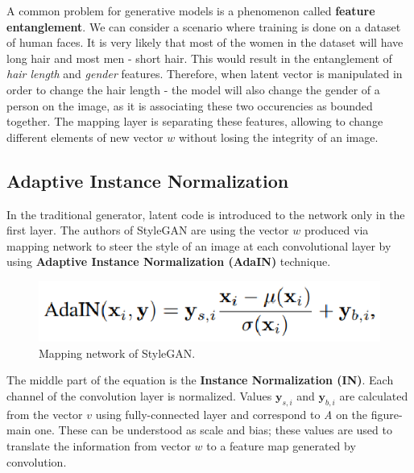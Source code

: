 \documentclass[12pt,a4paper,openany]{book}
\begin{document}
A common problem for generative models is a phenomenon called \textbf{feature entanglement}. We can consider a scenario where training is done on a dataset of human faces. It is very likely that most of the women in the dataset will have long hair and most men - short hair. This would result in the entanglement of \textit{hair length} and \textit{gender} features. Therefore, when latent vector is manipulated in order to change the hair length - the model will also change the gender of a person on the image, as it is associating these two occurencies as bounded together. The mapping layer is separating these features, allowing to change different elements of new vector $w$ without losing the integrity of an image.

\subsection{Adaptive Instance Normalization}


In the traditional generator, latent code is introduced to the network only in the first layer. The authors of StyleGAN are using the vector $w$ produced via mapping network to steer the style of an image at each convolutional layer by using \textbf{Adaptive Instance Normalization (AdaIN)} technique.

\begin{figure}[ht!]
    \centering
    \includegraphics[scale=1.2]{figs/adain.eps}
    \caption{Mapping network of StyleGAN.}\label{Fig:STYLEGAN}
\end{figure}

The middle part of the equation is the \textbf{Instance Normalization (IN)}. Each channel of the convolution layer is normalized. Values $\textbf{y}_{s,i}$ and $\textbf{y}_{b,i}$ are calculated from the vector $v$ using fully-connected layer and correspond to \textit{A} on the figure-main one. These can be understood as scale and bias; these values are used to translate the information from vector $w$ to a feature map generated by convolution.
\end{document}
